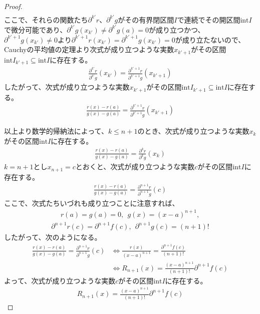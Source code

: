 \documentclass[dvipdfmx]{jsarticle}
\begin{document}
\begin{proof}
\begin{align*}
\end{align*}
ここで、それらの関数たち$\partial^{k'}r$、$\partial^{k'}g$がその有界閉区間$I$で連続でその開区間$\mathrm{int}I$で微分可能であり、$\partial^{k'}g\left( x_{k'} \right) \neq \partial^{k'}g(a) = 0$が成り立つかつ、$\partial^{k' + 1}g\left( x_{k'} \right) \neq 0$より$\partial^{k' + 1}r\left( x_{k'} \right) = \partial^{k' + 1}g\left( x_{k'} \right) = 0$が成り立たないので、Cauchyの平均値の定理より次式が成り立つような実数$x_{k' + 1}$がその区間$\mathrm{int}I_{k' + 1} \subseteq \mathrm{int}I$に存在する。
\begin{align*}
\frac{\partial^{k'}r}{\partial^{k'}g}\left( x_{k'} \right) = \frac{\partial^{k' + 1}r}{\partial^{k' + 1}g}\left( x_{k' + 1} \right)
\end{align*}
したがって、次式が成り立つような実数$x_{k' + 1}$がその区間$\mathrm{int}I_{k' + 1} \subseteq \mathrm{int}I$に存在する。
\begin{align*}
\frac{r(x) - r(a)}{g(x) - g(a)} = \frac{\partial^{k' + 1}r}{\partial^{k' + 1}g}\left( x_{k' + 1} \right)
\end{align*}\par
以上より数学的帰納法によって、$k \leq n + 1$のとき、次式が成り立つような実数$x_{k}$がその区間$\mathrm{int}I$に存在する。
\begin{align*}
\frac{r(x) - r(a)}{g(x) - g(a)} = \frac{\partial^{k}r}{\partial^{k}g}\left( x_{k} \right)
\end{align*}
$k = n + 1$とし$x_{n + 1} = c$とおくと、次式が成り立つような実数$c$がその区間$\mathrm{int}I$に存在する。
\begin{align*}
\frac{r(x) - r(a)}{g(x) - g(a)} = \frac{\partial^{n + 1}r}{\partial^{n + 1}g}(c)
\end{align*}
ここで、次式たちいづれも成り立つことに注意すれば、
\begin{align*}
r(a) = g(a) = 0,\ \ g(x) = (x - a)^{n + 1},
\end{align*}
\begin{align*}
\partial^{n + 1}r(c) = \partial^{n + 1}f(c),\ \ \partial^{n + 1}g(c) = (n + 1)!
\end{align*}
したがって、次のようになる。
\begin{align*}
\frac{r(x) - r(a)}{g(x) - g(a)} = \frac{\partial^{n + 1}r}{\partial^{n + 1}g}(c) &\Leftrightarrow \frac{r(x)}{(x - a)^{n + 1}} = \frac{\partial^{n + 1}f(c)}{(n + 1)!}\\
&\Leftrightarrow R_{n + 1}(x) = \frac{(x - a)^{n + 1}}{(n + 1)!}\partial^{n + 1}f(c)
\end{align*}
よって、次式が成り立つような実数$c$がその区間$\mathrm{int}I$に存在する。
\begin{align*}
R_{n + 1}(x) = \frac{(x - a)^{n + 1}}{(n + 1)!}\partial^{n + 1}f(c)
\end{align*}
\end{proof}
\end{document}
